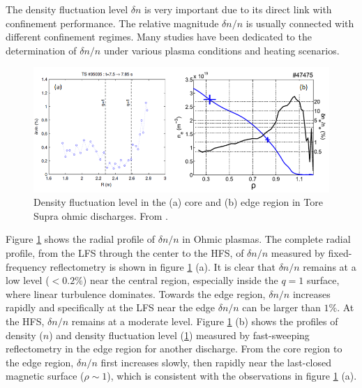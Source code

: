 The density fluctuation level $\delta n$ is very important due to its direct link with confinement performance. The relative magnitude $\delta n/n$ is usually connected with different confinement regimes. Many studies have been dedicated to the determination of $\delta n/n$ under various plasma conditions and heating scenarios.


\begin{figure}[h]
\begin{centering}
\includegraphics[scale=0.7]{fluc_level_ohmic.png}
\par\end{centering}
\caption{Density fluctuation level in the (a) core and (b) edge region in Tore Supra ohmic discharges. From \cite{Sabot_2006_NF, Greg_PhD_thesis}.}
\label{fig:fluc_level_ohmic}
\end{figure}


Figure \ref{fig:fluc_level_ohmic} shows the radial profile of $\delta n/n$ in Ohmic plasmas. The complete radial profile, from the LFS through the center to the HFS, of $\delta n/n$ measured by fixed-frequency reflectometry is shown in figure \ref{fig:fluc_level_ohmic} (a). It is clear that $\delta n/n$ remains at a low level ($< 0.2\%$) near the central region, especially inside the $q = 1$ surface, where linear turbulence dominates. Towards the edge region, $\delta n/n$ increases rapidly and specifically at the LFS near the edge $\delta n/n$ can be larger than $1 \%$. At the HFS, $\delta n/n$ remains at a moderate level. Figure \ref{fig:fluc_level_ohmic} (b) shows the profiles of density ($n$) and density fluctuation level (\ref{fig:fluc_level_ohmic}) measured by fast-sweeping reflectometry in the edge region for another discharge. From the core region to the edge region, $\delta n/n$ first increases slowly, then rapidly near the last-closed magnetic surface ($\rho \sim 1$), which is consistent with the observations in figure \ref{fig:fluc_level_ohmic} (a).

